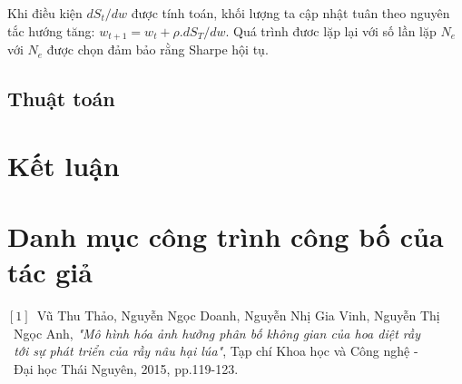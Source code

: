 \documentclass[14pt]{extreport}
\begin{document}
Khi điều kiện $dS_t/dw$ được tính toán, khối lượng ta cập nhật tuân theo nguyên tắc hướng tăng: $w_{t+1}=w_t+\rho.dS_T/dw$. Quá trình đươc lặp lại với số lần lặp $N_e$ với $N_e$ được chọn đảm bảo rằng Sharpe hội tụ.

\section{Thuật toán}

\chapter{Kết luận}
\newpage
{}
\chapter*{Danh mục công trình công bố của tác giả}
\begin{flushleft}



\quad $[1]$\ Vũ Thu Thảo, Nguyễn Ngọc Doanh, Nguyễn Nhị Gia Vinh, Nguyễn Thị\\\quad \quad \   Ngọc
Anh, \textit{"Mô hình hóa ảnh hưởng phân bố không gian của hoa diệt rầy\\ \quad \quad \  tới
sự phát triển của rầy nâu hại lúa"}, Tạp chí Khoa học và Công nghệ -\\\quad \quad \  Đại học Thái Nguyên, 2015, pp.119-123.\\
\end{flushleft}
\newpage
{}

\thispagestyle{empty}

\end{document}
